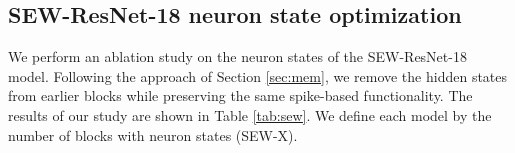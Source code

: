 
\subsection{SEW-ResNet-18 neuron state optimization}
\label{sec:memop}


We perform an ablation study on the neuron states of the SEW-ResNet-18 model. Following the approach of Section \ref{sec:mem}, we remove the hidden states from earlier blocks while preserving the same spike-based functionality. The results of our study are shown in Table \ref{tab:sew}. We define each model by the number of blocks with neuron states (SEW-X). 



